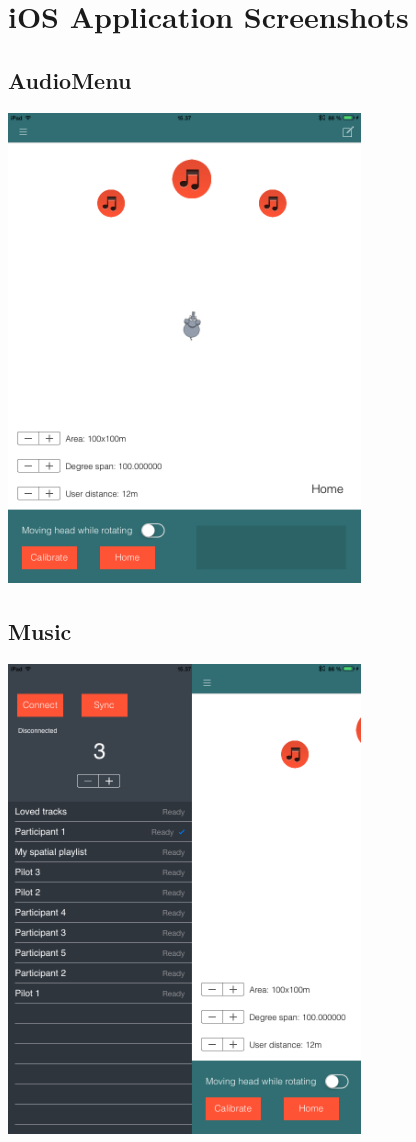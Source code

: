 \chapter{iOS Application Screenshots}
\label{sec:appendixviews}

\section{AudioMenu}

\includegraphics[width=0.7\textwidth]{Figures/view_audiomenu.png}


\section{Music}

\includegraphics[width=0.7\textwidth]{Figures/view_music.png}


